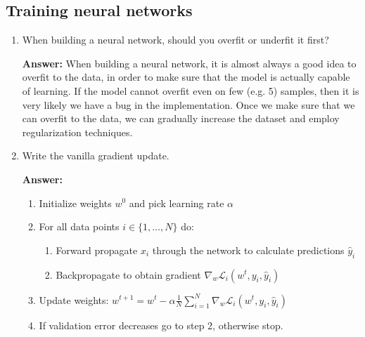 \documentclass{article}
\newenvironment{QandA}{\begin{enumerate}[label=\arabic*.]}{\end{enumerate}}
\newenvironment{answer}{\par\normalfont \textbf{Answer:}}{}
\begin{document}
\subsection{Training neural networks}
\begin{QandA}
    \item When building a neural network, should you overfit or underfit it first?
    \begin{answer}
        When building a neural network, it is almost always a good idea to overfit to the data, in order to make sure that the model is actually capable of learning. If the model cannot overfit even on few (e.g. 5) samples, then it is very likely we have a bug in the implementation. Once we make sure that we can overfit to the data, we can gradually increase the dataset and employ regularization techniques. 
    \end{answer}

    \item Write the vanilla gradient update.
    \begin{answer}
        \begin{enumerate}[label=\arabic*.]
            \item Initialize weights $w^0$ and pick learning rate $\alpha$
            \item For all data points $i \in \{1, \ldots, N\}$ do:
            \begin{enumerate}[label=2.\arabic*.]
                \item Forward propagate $x_i$ through the network to calculate predictions $\hat{y}_i$
                \item Backpropagate to obtain gradient $\nabla_w \mathcal{L}_i (w^t, y_i, \hat{y}_i)$
            \end{enumerate}
            \item Update weights: $w^{t+1} = w^t - \alpha \frac{1}{N}\sum_{i=1}^N \nabla_w \mathcal{L}_i(w^t, y_i, \hat{y}_i)$
            \item If validation error decreases go to step 2, otherwise stop.
        \end{enumerate}
    \end{answer}


\end{QandA}
\end{document}
